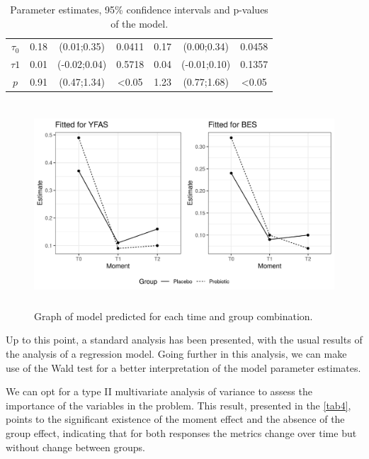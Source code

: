 \documentclass[USenglish]{article}
\theoremstyle{dgthm}
\theoremstyle{dgdef}
\begin{document}
\begin{table}[H]
\begin{tabular}{c|cccccc}
$\tau_0$                   & 0.18       & (0.01;0.35)                                                       & \multicolumn{1}{c|}{0.0411} & 0.17       & (0.00;0.34)                                                       & 0.0458           \\
$\tau1$                    & 0.01       & (-0.02;0.04)                                                      & \multicolumn{1}{c|}{0.5718}           & 0.04       & (-0.01;0.10)                                                      & 0.1357           \\
$p$                        & 0.91       & (0.47;1.34)                                                       & \multicolumn{1}{c|}{\textless 0.05} & 1.23       & (0.77;1.68)                                                       & \textless 0.05 \\ \hline
\end{tabular}
\caption{Parameter estimates, 95\% confidence intervals and p-values of the model.}
\label{tab3}
\end{table}

\begin{figure}[H]
\centering
\includegraphics[width=31.5pc,height=18pc]{FIGURES/FIGURE6.jpeg}
\caption{Graph of model predicted for each time and group combination.\label{fig6}}
\end{figure}

  
Up to this point, a standard analysis has been presented, with the usual results of the analysis of a regression model. Going further in this analysis, we can make use of the Wald test for a better interpretation of the model parameter estimates.

We can opt for a type II multivariate analysis of variance to assess the importance of the variables in the problem. This result, presented in the \autoref{tab4}, points to the significant existence of the moment effect and the absence of the group effect, indicating that for both responses the metrics change over time but without change between groups.
\end{document}
